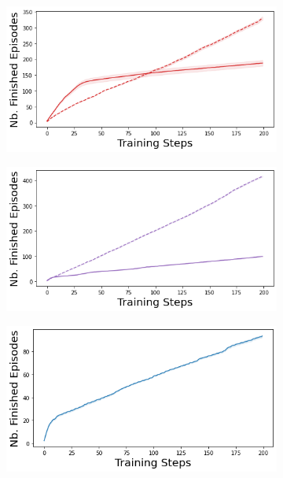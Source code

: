 \begin{figure}
    \begin{subfigure}{.245\textwidth}
        \includegraphics[width=\textwidth]{sections/011_icml2022/resources/cartpole-n_finished_training_episodes-dropout-training-strategy.png}
    \end{subfigure}
    \begin{subfigure}{.245\textwidth}
        \includegraphics[width=\textwidth]{sections/011_icml2022/resources/cartpole-n_finished_training_episodes-ensemble-training-strategy.png}
    \end{subfigure}
    \begin{subfigure}{.245\textwidth}
        \includegraphics[width=\textwidth]{sections/011_icml2022/resources/cartpole-n_finished_training_episodes-dkl-training-strategy.png}

\end{subfigure}
\end{figure}
